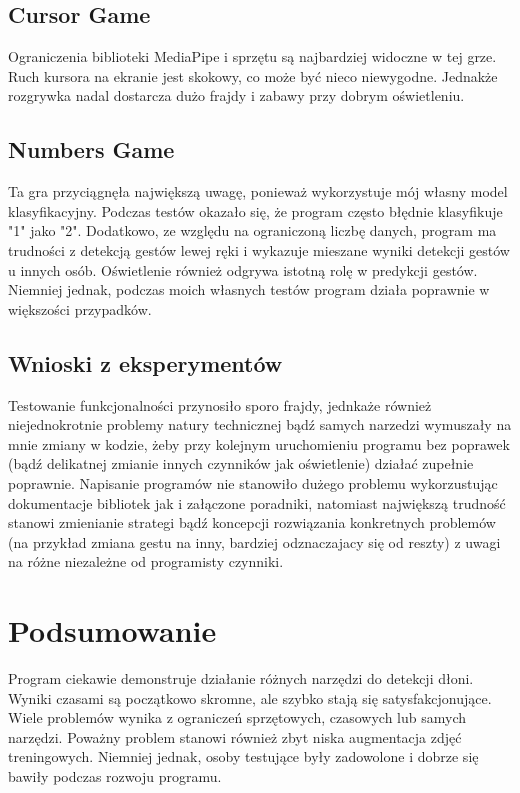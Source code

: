 \documentclass{article}
\begin{document}
\subsection{Cursor Game}
Ograniczenia biblioteki MediaPipe i sprzętu są najbardziej widoczne w tej grze. Ruch kursora na ekranie jest skokowy, co może być nieco niewygodne. Jednakże rozgrywka nadal dostarcza dużo frajdy i zabawy przy dobrym oświetleniu.

\newpage

\subsection{Numbers Game}
Ta gra przyciągnęła największą uwagę, ponieważ wykorzystuje mój własny model klasyfikacyjny. Podczas testów okazało się, że program często błędnie klasyfikuje "1" jako "2". Dodatkowo, ze względu na ograniczoną liczbę danych, program ma trudności z detekcją gestów lewej ręki i wykazuje mieszane wyniki detekcji gestów u innych osób. Oświetlenie również odgrywa istotną rolę w predykcji gestów. Niemniej jednak, podczas moich własnych testów program działa poprawnie w większości przypadków.

\subsection{Wnioski z eksperymentów}
Testowanie funkcjonalności przynosiło sporo frajdy, jednkaże również niejednokrotnie problemy natury technicznej bądź samych narzedzi wymuszały na mnie zmiany w kodzie, żeby przy kolejnym uruchomieniu programu bez poprawek (bądź delikatnej zmianie innych czynników jak oświetlenie) działać zupełnie poprawnie. Napisanie programów nie stanowiło dużego problemu wykorzustując dokumentacje bibliotek jak i załączone poradniki, natomiast największą trudność stanowi zmienianie strategi bądź koncepcji rozwiązania konkretnych problemów (na przykład zmiana gestu na inny, bardziej odznaczajacy się od reszty) z uwagi na różne niezależne od programisty czynniki.

\section{Podsumowanie}
Program ciekawie demonstruje działanie różnych narzędzi do detekcji dłoni. Wyniki czasami są początkowo skromne, ale szybko stają się satysfakcjonujące. Wiele problemów wynika z ograniczeń sprzętowych, czasowych lub samych narzędzi. Poważny problem stanowi również zbyt niska augmentacja zdjęć treningowych. Niemniej jednak, osoby testujące były zadowolone i dobrze się bawiły podczas rozwoju programu.
\end{document}
